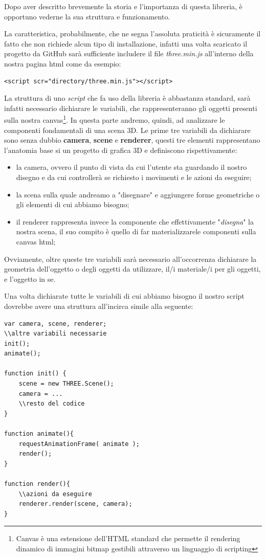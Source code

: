 Dopo aver descritto brevemente la storia e l'importanza di questa libreria, è opportuno vederne la sua struttura e funzionamento.

La caratteristica, probabilmente, che ne segna l'assoluta praticità è sicuramente il fatto che non richiede alcun tipo di installazione, infatti una volta scaricato il progetto da GitHub sarà sufficiente includere il file \textit{three.min.js} all'interno della nostra pagina html come da esempio:
\begin{lstlisting}
<script scr="directory/three.min.js"></script>
\end{lstlisting}

La struttura di uno \textit{script} che fa uso della libreria è abbastanza standard, sarà infatti necessario dichiarare le variabili, che rappresenteranno gli oggetti presenti sulla nostra canvas\footnote{Canvas è una estensione dell'HTML standard che permette il rendering dinamico di immagini bitmap gestibili attraverso un linguaggio di scripting\cite{wiki:canv}}. In questa parte andremo, quindi, ad analizzare le componenti fondamentali di una scena 3D. Le prime tre variabili da dichiarare sono senza dubbio \textbf{camera}, \textbf{scene} e \textbf{renderer}, questi tre elementi rappresentano l'anatomia base si un progetto di grafica 3D e definiscono rispettivamente: 
\begin{itemize}
	\item la camera, ovvero il punto di vista da cui l'utente sta guardando il nostro disegno e da cui controllerà se richiesto i movimenti e le azioni da eseguire;
	\item la scena sulla quale andreamo a "disegnare" e aggiungere forme geometriche o gli elementi di cui abbiamo bisogno;
	\item il renderer rappresenta invece la componente che effettivamente "\textit{disegna}" la nostra scena, il suo compito è quello di far materializzarele componenti sulla canvas html;
\end{itemize}
Ovviamente, oltre queste tre variabili sarà necessario all'occorrenza dichiarare la geometria dell'oggetto o degli oggetti da utilizzare, il/i materiale/i per gli oggetti, e l'oggetto in se. 

Una volta dichiarate tutte le variabili di cui abbiamo bisogno il nostro script dovrebbe avere una struttura all'incirca simile alla seguente:
\begin{lstlisting}
var camera, scene, renderer;
\\altre variabili necessarie
init();
animate();

function init() {
	scene = new THREE.Scene();
	camera = ...
	\\resto del codice
}

function animate(){
	requestAnimationFrame( animate );
	render();
}

function render(){
	\\azioni da eseguire
	renderer.render(scene, camera);
}
\end{lstlisting}

